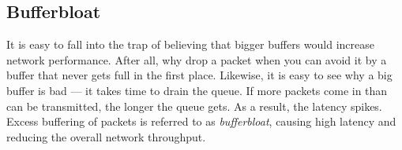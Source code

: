 













\subsection{Bufferbloat}

It is easy to fall into the trap of believing that bigger buffers would increase network performance. After all, why drop a packet when you can avoid it by a buffer that never gets full in the first place. Likewise, it is easy to see why a big buffer is bad --- it takes time to drain the queue. If more packets come in than can be transmitted, the longer the queue gets. As a result, the latency spikes. Excess buffering of packets is referred to as \textit{bufferbloat}, causing high latency and reducing the overall network throughput.

